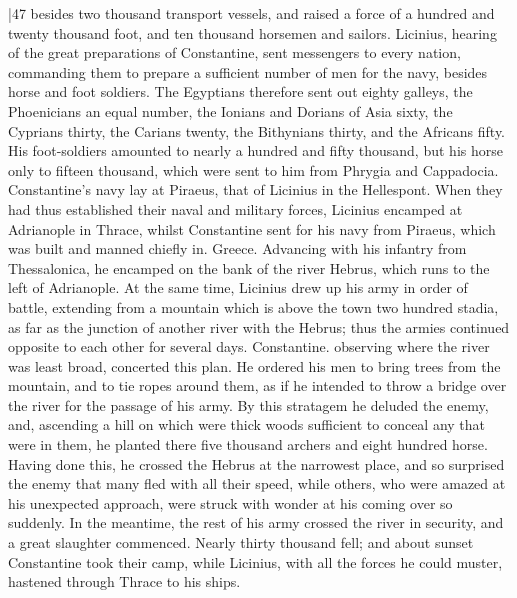 |47 besides two thousand transport vessels, and raised a force of a hundred and twenty thousand foot, and ten thousand horsemen and sailors. Licinius, hearing of the great preparations of Constantine, sent messengers to every nation, commanding them to prepare a sufficient number of men for the navy, besides horse and foot soldiers. The Egyptians therefore sent out eighty galleys, the Phoenicians an equal number, the Ionians and Dorians of Asia sixty, the Cyprians thirty, the Carians twenty, the Bithynians thirty, and the Africans fifty. His foot-soldiers amounted to nearly a hundred and fifty thousand, but his horse only to fifteen thousand, which were sent to him from Phrygia and Cappadocia. Constantine's navy lay at Piraeus, that of Licinius in the Hellespont. When they had thus established their naval and military forces, Licinius encamped at Adrianople in Thrace, whilst Constantine sent for his navy from Piraeus, which was built and manned chiefly in. Greece. Advancing with his infantry from Thessalonica, he encamped on the bank of the river Hebrus, which runs to the left of Adrianople. At the same time, Licinius drew up his army in order of battle, extending from a mountain which is above the town two hundred stadia, as far as the junction of another river with the Hebrus; thus the armies continued opposite to each other for several days. Constantine. observing where the river was least broad, concerted this plan. He ordered his men to bring trees from the mountain, and to tie ropes around them, as if he intended to throw a bridge over the river for the passage of his army. By this stratagem he deluded the enemy, and, ascending a hill on which were thick woods sufficient to conceal any that were in them, he planted there five thousand archers and eight hundred horse. Having done this, he crossed the Hebrus at the narrowest place, and so surprised the enemy that many fled with all their speed, while others, who were amazed at his unexpected approach, were struck with wonder at his coming over so suddenly. In the meantime, the rest of his army crossed the river in security, and a great slaughter commenced. Nearly thirty thousand fell; and about sunset Constantine took their camp, while Licinius, with all the forces he could muster, hastened through Thrace to his ships.

